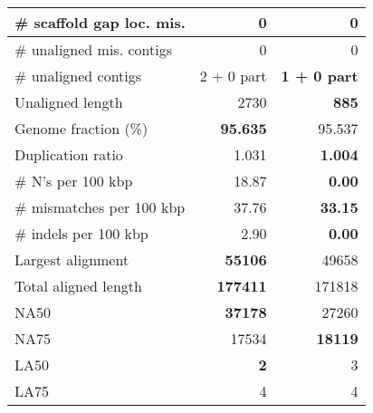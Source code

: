 \documentclass[12pt,a4paper]{article}
\begin{document}
\begin{table}[ht]
\begin{center}
\begin{tabular}{|l*{2}{|r}|}
\# scaffold gap loc. mis. & 0 & 0 \\ \hline
\# unaligned mis. contigs & 0 & 0 \\ \hline
\# unaligned contigs & 2 + 0 part & {\bf 1 + 0 part} \\ \hline
Unaligned length & 2730 & {\bf 885} \\ \hline
Genome fraction (\%) & {\bf 95.635} & 95.537 \\ \hline
Duplication ratio & 1.031 & {\bf 1.004} \\ \hline
\# N's per 100 kbp & 18.87 & {\bf 0.00} \\ \hline
\# mismatches per 100 kbp & 37.76 & {\bf 33.15} \\ \hline
\# indels per 100 kbp & 2.90 & {\bf 0.00} \\ \hline
Largest alignment & {\bf 55106} & 49658 \\ \hline
Total aligned length & {\bf 177411} & 171818 \\ \hline
NA50 & {\bf 37178} & 27260 \\ \hline
NA75 & 17534 & {\bf 18119} \\ \hline
LA50 & {\bf 2} & 3 \\ \hline
LA75 & 4 & 4 \\ \hline
\end{tabular}
\end{center}
\end{table}
\end{document}
